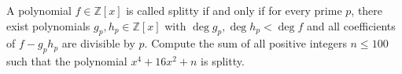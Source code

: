 A polynomial $f \in \mathbb{Z}[x]$ is called splitty if and only if for every prime $p$, there exist polynomials $g_{p}, h_{p} \in \mathbb{Z}[x]$ with $\operatorname{deg} g_{p}, \operatorname{deg} h_{p}<\operatorname{deg} f$ and all coefficients of $f-g_{p} h_{p}$ are divisible by $p$. Compute the sum of all positive integers $n \leq 100$ such that the polynomial $x^{4}+16 x^{2}+n$ is splitty.